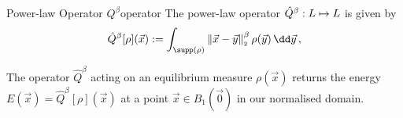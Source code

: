 \begin{definition}{Power-law Operator $Q^\beta$}{operator}
  The power-law operator $\hat{Q}^\beta: L \mapsto L$ is given by
  $$\hat{Q}^\beta[\rho](\vec{x}) := \int_{\supp(\rho)} \norm{\vec{x}-\vec{y}}^\beta \rho(\vec{y}) \,\dd\vec{y}\,,$$
\end{definition}

The operator $\hat{Q}^\beta$ acting on an equilibrium measure $\rho(\vec{x})$ returns the energy $E(\vec{x}) = \hat{Q}^\beta[\rho](\vec{x})$ at a point $\vec{x} \in B_1(\vec{0})$ in our normalised domain.
